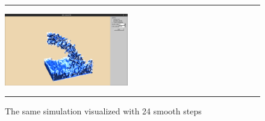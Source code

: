 \begin{figure}[!th]
\hrule
\begin{center}
\vspace*{2ex}\includegraphics[width=0.48\textwidth,clip=true,trim=10cm 1cm 10cm 5cm]{pictures/colors_smoothed.png}
\end{center}
\caption{The same simulation visualized with 24 smooth steps}
\label{fig:res2} 
\vspace*{2ex}
\hrule
\end{figure}
